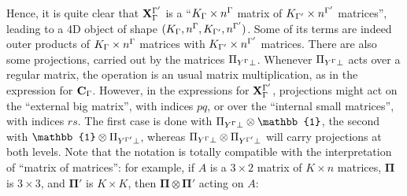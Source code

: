 \documentclass[a4paper,11pt]{article}
\begin{document}
Hence, it is quite clear that $\mathbf{X}_{\Gamma}^{\Gamma'}$ is a ``$K_{\Gamma} \times n^{\Gamma}$ matrix of $K_{\Gamma'} \times n^{\Gamma'}$ matrices'', leading to a 4D object of shape $(K_{\Gamma}, n^{\Gamma},K_{\Gamma'}, n^{\Gamma'})$.
Some of its terms are indeed outer products of $K_{\Gamma} \times n^{\Gamma}$ matrices with $K_{\Gamma'} \times n^{\Gamma'}$ matrices.
There are also some projections, carried out by the matrices $\Pi_{Y^{\Gamma} \perp}$.
Whenever $\Pi_{Y^{\Gamma} \perp}$ acts over a regular matrix, the operation is an usual matrix multiplication, as in the expression for $\mathbf{C}_{\Gamma}$.
However, in the expressions for $\mathbf{X}_{\Gamma}^{\Gamma'}$, projections might act on the ``external big matrix'', with indices $pq$, or over the ``internal small matrices'', with indices $rs$.
The first case is done with $\Pi_{Y^\irp \perp} \otimes \mathbb{1}$, the second with $\mathbb{1} \otimes \Pi_{Y^\irpP \perp}$, whereas $\Pi_{Y^{\Gamma} \perp} \otimes \Pi_{Y^{\Gamma'} \perp}$ will carry projections at both levels.
Note that the notation is totally compatible with the interpretation of ``matrix of matrices'':
for example, if $A$ is a $3 \times 2$ matrix of $K \times n$ matrices, $\mathbf{\Pi}$ is $3 \times 3$, and $\mathbf{\Pi}'$ is $K \times K$, then $\mathbf{\Pi} \otimes \mathbf{\Pi}'$ acting on $A$:
\end{document}

